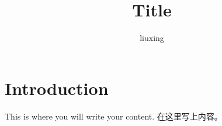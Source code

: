 \documentclass{article}
\title{Title}
\author{liuxing}
\begin{document}
 
\maketitle{}
 
\section{Introduction}
 
This is where you will write your content. 在这里写上内容。
 
\end{document}
